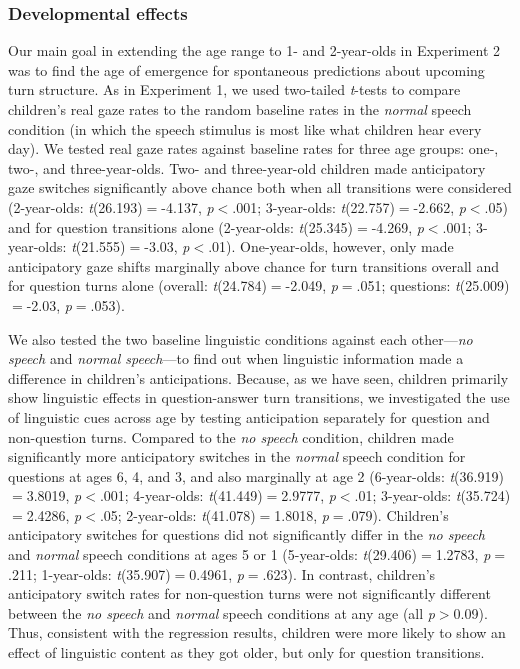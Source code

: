 \documentclass[authoryear, 12pt]{elsarticle}
\begin{document}
\subsubsection*{Developmental effects}

Our main goal in extending the age range to 1- and 2-year-olds in Experiment 2 was to find the age of emergence for spontaneous predictions about upcoming turn structure. As in Experiment 1, we used two-tailed \textit{t}-tests to compare children's real gaze rates to the random baseline rates in the \textit{normal} speech condition (in which the speech stimulus is most like what children hear every day). We tested real gaze rates against baseline rates for three age groups: one-, two-, and three-year-olds. Two- and three-year-old children made anticipatory gaze switches significantly above chance both when all transitions were considered (2-year-olds: \textit{t}(26.193)$=$-4.137, \textit{p}$<$.001; 3-year-olds: \textit{t}(22.757)$=$-2.662, \textit{p}$<$.05) and for question transitions alone (2-year-olds: \textit{t}(25.345)$=$-4.269, \textit{p}$<$.001; 3-year-olds: \textit{t}(21.555)$=$-3.03, \textit{p}$<$.01). One-year-olds, however, only made anticipatory gaze shifts marginally above chance for turn transitions overall and for question turns alone (overall: \textit{t}(24.784)$=$-2.049, \textit{p}$=$.051; questions: \textit{t}(25.009)$=$-2.03, \textit{p}$=$.053).

We also tested the two baseline linguistic conditions against each other---\textit{no speech} and \textit{normal speech}---to find out when linguistic information made a difference in children's anticipations. Because, as we have seen, children primarily show linguistic effects in question-answer turn transitions, we investigated the use of linguistic cues across age by testing anticipation separately for question and non-question turns. Compared to the \textit{no speech} condition, children made significantly more anticipatory switches in the \textit{normal} speech condition for questions at ages 6, 4, and 3, and also marginally at age 2 (6-year-olds: \textit{t}(36.919)$=$3.8019, \textit{p}$<$.001; 4-year-olds: \textit{t}(41.449)$=$2.9777, \textit{p}$<$.01; 3-year-olds: \textit{t}(35.724)$=$2.4286, \textit{p}$<$.05; 2-year-olds: \textit{t}(41.078)$=$1.8018, \textit{p}$=$.079). Children's anticipatory switches for questions did not significantly differ in the \textit{no speech} and \textit{normal} speech conditions at ages 5 or 1 (5-year-olds: \textit{t}(29.406)$=$1.2783, \textit{p}$=$.211; 1-year-olds: \textit{t}(35.907)$=$0.4961, \textit{p}$=$.623). In contrast, children's anticipatory switch rates for non-question turns were not significantly different between the \textit{no speech} and \textit{normal} speech conditions at any age (all \textit{p}$>$0.09). Thus, consistent with the regression results, children were more likely to show an effect of linguistic content as they got older, but only for question transitions.
\end{document}
